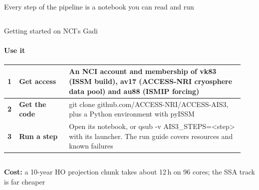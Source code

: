 \documentclass[aspectratio=169,11pt]{beamer}
\makeatletter
\newcommand{\serif}{\fontfamily{qpl}\selectfont}  %
\newcommand{\source}[1]{\gdef\beamer@shortsource{#1}}
\gdef\beamer@shortsource{}
\newcommand{\nosource}{\source{}}
\makeatother
\begin{document}
\begin{frame}{Every step of the pipeline is a notebook you can read and run}
\begin{columns}[T,onlytextwidth]
\end{columns}
\end{frame}

\nosource
\begin{frame}{Getting started on NCI's Gadi}
\framesubtitle{Use it}
\vspace{2mm}
\renewcommand{\arraystretch}{1.2}\small{}
\begin{tabular}{@{}p{0.04\linewidth}p{0.2\linewidth}p{0.7\linewidth}@{}}
\arrayrulecolor{paper2}\hline
{\serif\Large\bfseries\color{accent}1} & {\serif\large\bfseries\color{navy}Get access} & {\color{muted}An NCI account and membership of vk83 (ISSM build), av17 (ACCESS-NRI cryosphere data pool) and au88 (\mbox{ISMIP} forcing)}\\\hline
{\serif\Large\bfseries\color{accent}2} & {\serif\large\bfseries\color{navy}Get the code} & {\color{muted}\colorbox{paper2}{\footnotesize\ttfamily\color{navy}git clone github.com/ACCESS-NRI/ACCESS-AIS3}, plus a Python environment with pyISSM}\\\hline
{\serif\Large\bfseries\color{accent}3} & {\serif\large\bfseries\color{navy}Run a step} & {\color{muted}Open its notebook, or \colorbox{paper2}{\footnotesize\ttfamily\color{navy}qsub -v AIS3\_STEPS=<step>} with its launcher. The run guide covers resources and known failures}\\\hline
\end{tabular}
\vspace{1mm}
\begin{columns}[T,onlytextwidth]
\colorbox{paper2}{\begin{minipage}{\dimexpr\linewidth-2\fboxsep\relax}\vspace{1mm}\footnotesize\color{muted}\textbf{\color{navy}Cost:} a 10-year HO projection chunk takes about 12\,h on 96 cores; the SSA track is far cheaper\vspace{1mm}\end{minipage}}

\end{columns}
\end{frame}
\end{document}
